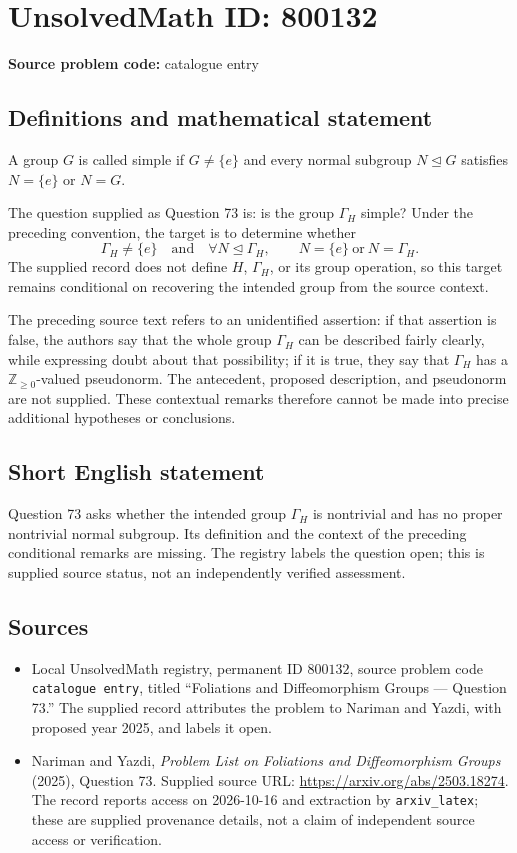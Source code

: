 \documentclass[11pt]{article}
\begin{document}
\section*{UnsolvedMath ID: 800132}
\textbf{Source problem code:} catalogue entry
\subsection{Definitions and mathematical statement}
A group \(G\) is called simple if \(G\neq\{e\}\) and every normal subgroup \(N\trianglelefteq G\) satisfies \(N=\{e\}\) or \(N=G\).

The question supplied as Question 73 is: is the group \(\Gamma_H\) simple? Under the preceding convention, the target is to determine whether
\[
\Gamma_H\neq\{e\}
\quad\text{and}\quad
\forall N\trianglelefteq\Gamma_H,\qquad N=\{e\}\ \text{or}\ N=\Gamma_H.
\]
The supplied record does not define \(H\), \(\Gamma_H\), or its group operation, so this target remains conditional on recovering the intended group from the source context.

The preceding source text refers to an unidentified assertion: if that assertion is false, the authors say that the whole group \(\Gamma_H\) can be described fairly clearly, while expressing doubt about that possibility; if it is true, they say that \(\Gamma_H\) has a \(\mathbb Z_{\geq 0}\)-valued pseudonorm. The antecedent, proposed description, and pseudonorm are not supplied. These contextual remarks therefore cannot be made into precise additional hypotheses or conclusions.
\subsection{Short English statement}
Question 73 asks whether the intended group \(\Gamma_H\) is nontrivial and has no proper nontrivial normal subgroup. Its definition and the context of the preceding conditional remarks are missing. The registry labels the question open; this is supplied source status, not an independently verified assessment.
\subsection{Sources}
\begin{itemize}
\item Local UnsolvedMath registry, permanent ID \(800132\), source problem code \texttt{catalogue entry}, titled ``Foliations and Diffeomorphism Groups --- Question 73.'' The supplied record attributes the problem to Nariman and Yazdi, with proposed year 2025, and labels it open.
\item Nariman and Yazdi, \emph{Problem List on Foliations and Diffeomorphism Groups} (2025), Question 73. Supplied source URL: \url{https://arxiv.org/abs/2503.18274}. The record reports access on 2026-10-16 and extraction by \texttt{arxiv\_latex}; these are supplied provenance details, not a claim of independent source access or verification.
\end{itemize}
\end{document}
